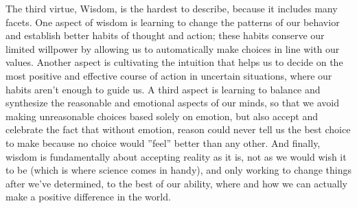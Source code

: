 \documentclass[ebook,12pt,openany,twoside]{memoir}
\begin{document}
The third virtue, Wisdom, is the hardest to describe, because it includes many
facets. One aspect of wisdom is learning to change the patterns of our behavior
and establish better habits of thought and action; these habits conserve our
limited willpower by allowing us to automatically make choices in line with our
values. Another aspect is cultivating the intuition that helps us to decide on
the most positive and effective course of action in uncertain situations, where
our habits aren't enough to guide us. A third aspect is learning to balance and
synthesize the reasonable and emotional aspects of our minds, so that we avoid
making unreasonable choices based solely on emotion, but also accept and
celebrate the fact that without emotion, reason could never tell us the best
choice to make because no choice would ''feel'' better than any other. And
finally, wisdom is fundamentally about accepting reality as it is, not as we
would wish it to be (which is where science comes in handy), and only working
to change things after we've determined, to the best of our ability, where and
how we can actually make a positive difference in the world.


\newpage
\tableofcontents
\end{document}

